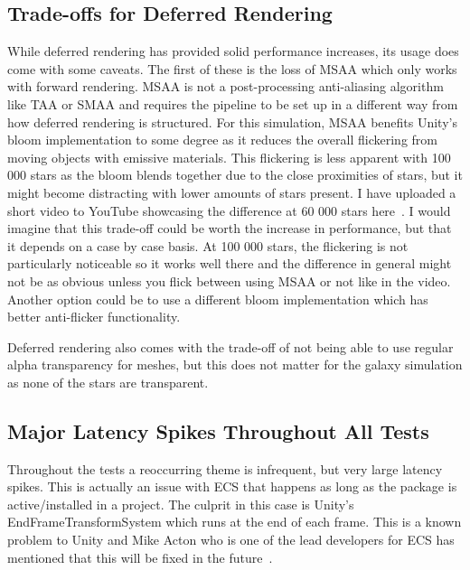 \subsection{Trade-offs for Deferred Rendering}
While deferred rendering has provided solid performance increases, its usage does come with some caveats. The first of these is the loss of MSAA which only works with forward rendering. MSAA is not a post-processing anti-aliasing algorithm like TAA or SMAA and requires the pipeline to be set up in a different way from how deferred rendering is structured. For this simulation, MSAA benefits Unity's bloom implementation to some degree as it reduces the overall flickering from moving objects with emissive materials. This flickering is less apparent with 100 000 stars as the bloom blends together due to the close proximities of stars, but it might become distracting with lower amounts of stars present. I have uploaded a short video to YouTube showcasing the difference at 60 000 stars here~\cite{msaabloom}. I would imagine that this trade-off could be worth the increase in performance, but that it depends on a case by case basis. At 100 000 stars, the flickering is not particularly noticeable so it works well there and the difference in general might not be as obvious unless you flick between using MSAA or not like in the video. Another option could be to use a different bloom implementation which has better anti-flicker functionality. 

Deferred rendering also comes with the trade-off of not being able to use regular alpha transparency for meshes, but this does not matter for the galaxy simulation as none of the stars are transparent. 

\subsection{Major Latency Spikes Throughout All Tests}
Throughout the tests a reoccurring theme is infrequent, but very large latency spikes. This is actually an issue with ECS that happens as long as the package is active/installed in a project. The culprit in this case is Unity's EndFrameTransformSystem which runs at the end of each frame. This is a known problem to Unity and Mike Acton who is one of the lead developers for ECS has mentioned that this will be fixed in the future~\cite{actonForum}. 

